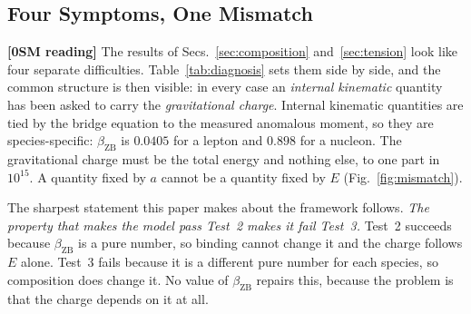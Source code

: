 \documentclass[%
 reprint, amsmath,amssymb, aps, prb, ]{revtex4-2}
\numberwithin{equation}{section}
\newcommand{\betaZB}{\beta_{\text{ZB}}}
\begin{document}
\subsection{Four Symptoms, One Mismatch}
\label{subsec:four_symptoms}

\textbf{[0SM reading]} The results of Secs.~\ref{sec:composition} and~\ref{sec:tension} look like four separate difficulties. Table~\ref{tab:diagnosis} sets them side by side, and the common structure is then visible: in every case an \emph{internal kinematic} quantity has been asked to carry the \emph{gravitational charge}. Internal kinematic quantities are tied by the bridge equation to the measured anomalous moment, so they are species-specific: $\betaZB$ is $0.0405$ for a lepton and $0.898$ for a nucleon. The gravitational charge must be the total energy and nothing else, to one part in $10^{15}$. A quantity fixed by $a$ cannot be a quantity fixed by $E$ (Fig.~\ref{fig:mismatch}).

The sharpest statement this paper makes about the framework follows. \emph{The property that makes the model pass Test~2 makes it fail Test~3.} Test~2 succeeds because $\betaZB$ is a pure number, so binding cannot change it and the charge follows $E$ alone. Test~3 fails because it is a different pure number for each species, so composition does change it. No value of $\betaZB$ repairs this, because the problem is that the charge depends on it at all.
\end{document}
